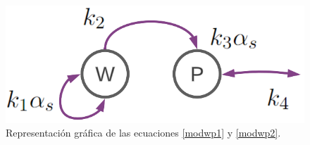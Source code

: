 \begin{figure}[H]
	 \begin{center}
	 \includegraphics[scale=0.48504]{img/grafoedo.png}
	 \end{center}
	 \caption{Representación gráfica de las ecuaciones \ref{modwp1} y \ref{modwp2}. \label{anexografoedo}}
\end{figure}






